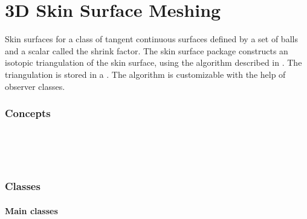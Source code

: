 
\chapter{3D Skin Surface Meshing}
\label{chapterSkinSurfaceRef}

Skin surfaces for a class of tangent continuous surfaces defined by a
set of balls and a scalar called the shrink factor. The skin surface
package constructs an isotopic triangulation of the skin surface,
using the algorithm described in \cite{cgal:kv-mssct-05}. The
triangulation is stored in a . The algorithm
is customizable with the help of observer classes.

\subsection*{Concepts}
\\
\\
\\
\subsection*{Classes}
\subsubsection*{Main classes}


\\

